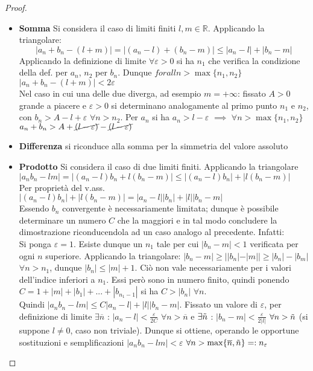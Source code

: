 \documentclass[10pt, oneside]{book}
\theoremstyle{plain}
\begin{document}
\begin{proof}
\begin{itemize}
    \item \textbf{Somma} Si considera il caso di limiti finiti $l, m \in \mathbb{R}$. Applicando la triangolare:
    \[|a_n + b_n - (l+m)| = |(a_n - l) + (b_n - m)| \leq |a_n - l| + |b_n - m|\]
    Applicando la definizione di limite $\forall \varepsilon > 0$ si ha $n_1$ che verifica la condizione della def. per $a_n$, $n_2$ per $b_n$. Dunque $forall n > \max\{n_1, n_2\}$ $|a_n + b_n - (l+m)| < 2\varepsilon$
    \\Nel caso in cui una delle due diverga, ad esempio $m = +\infty$: fissato $A>0$ grande a piacere e $\varepsilon >0$ si determinano analogamente al primo punto $n_1$ e $n_2$, con $b_n > A - l + \varepsilon$ $\forall n > n_2$. Per $a_n$ si ha $a_n > l - \varepsilon$ $\implies$ $\forall n > \max\{n_1, n_2\}$ $a_n + b_n > A + \cancel{(l - \varepsilon)} - \cancel{(l - \varepsilon)}$
    \item \textbf{Differenza} si riconduce alla somma per la simmetria del valore assoluto
    \item \textbf{Prodotto} Si considera il caso di due limiti finiti. Applicando la triangolare
    $|a_n b_n - l m| = |(a_n - l) b_n + l (b_n - m)| \leq |(a_n - l) b_n| + |l (b_n - m)|$
    \\Per proprietà del v.ass. $|(a_n - l) b_n| + |l (b_n - m)| = |a_n - l||b_n| + |l||b_n - m|$
    \\Essendo $b_n$ convergente è necessariamente limitata; dunque è possibile determinare un numero $C$ che la maggiori e in tal modo concludere la dimostrazione riconducendola ad un caso analogo al precedente. Infatti:
    \\Si ponga $\varepsilon = 1$. Esiste dunque un $n_1$ tale per cui $|b_n -m| < 1$ verificata per ogni $n$ superiore. Applicando la triangolare: $|b_n - m| \geq ||b_n| - |m|| \geq |b_n| - |b_m|$ $\forall n > n_1$, dunque $|b_n| \leq |m| + 1$. Ciò non vale necessariamente per i valori dell'indice inferiori a $n_1$. Essi però sono in numero finito, quindi ponendo $C = 1 + |m| + |b_1| + ... + |b_{n_1-1}|$ si ha $C > |b_n|$ $\forall n$.
    \\Quindi $|a_n b_n - l m| \leq C |a_n - l| + |l| |b_n - m|$. Fissato un valore di $\varepsilon$, per definizione di limite $\exists \overline{n}$ : $|a_n - l| < \frac{\varepsilon}{2C}$ $\forall n > \overline{n}$ e $\exists \Tilde{n}$ : $|b_n - m| < \frac{\varepsilon}{2|l|}$ $\forall n > \Tilde{n}$ (si suppone $l \neq 0$, caso non triviale). Dunque si ottiene, operando le opportune sostituzioni e semplificazioni $|a_n b_n - l m| < \varepsilon$ $\forall n > \max \{\overline{n}, \Tilde{n}\} =: n_\varepsilon$

\end{itemize}
\end{proof}
\end{document}
